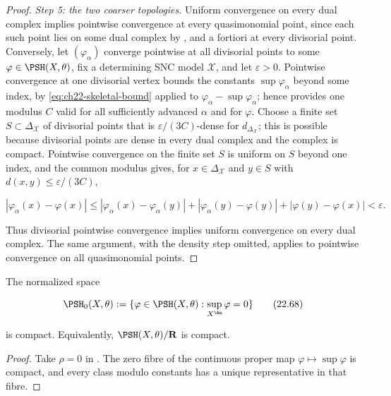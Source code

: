 \begin{proof}
\emph{Step 5: the two coarser topologies.}  Uniform convergence on every
dual complex implies pointwise convergence at every quasimonomial point,
since each such point lies on some dual complex by
, and a fortiori at every divisorial point.
Conversely, let \((\varphi_\alpha)\) converge pointwise at all divisorial
points to some \(\varphi\in\PSH(X,\theta)\), fix a determining SNC model
\(\mathcal X\), and let \(\varepsilon>0\).  Pointwise convergence at one
divisorial vertex bounds the constants \(\sup\varphi_\alpha\) beyond some
index, by \eqref{eq:ch22-skeletal-bound} applied to
\(\varphi_\alpha-\sup\varphi_\alpha\); hence
 provides one modulus \(C\) valid for all
sufficiently advanced \(\alpha\) and for \(\varphi\).  Choose a finite set
\(S\subset\Delta_{\mathcal X}\) of divisorial points that is
\(\varepsilon/(3C)\)-dense for \(d_{\Delta_{\mathcal X}}\); this is possible
because divisorial points are dense in every dual complex and the complex is
compact.  Pointwise convergence on the finite set \(S\) is uniform on
\(S\) beyond one index, and the common modulus gives, for
\(x\in\Delta_{\mathcal X}\) and \(y\in S\) with
\(d(x,y)\leq\varepsilon/(3C)\),

\[
 |\varphi_\alpha(x)-\varphi(x)|
 \leq|\varphi_\alpha(x)-\varphi_\alpha(y)|
   +|\varphi_\alpha(y)-\varphi(y)|
   +|\varphi(y)-\varphi(x)|
 <\varepsilon .
\]

Thus divisorial pointwise convergence implies uniform convergence on every
dual complex.  The same argument, with the density step omitted, applies to
pointwise convergence on all quasimonomial points.
\end{proof}

\begin{corollary}\label{thm:bfj-psh-compactness}
The normalized space

\[
 \PSH_0(X,\theta)
 :=\{\varphi\in\PSH(X,\theta):
                    \sup_{X^{\An}}\varphi=0\}
\tag{22.68}\label{eq:ch22-normalized-space}
\]

is compact.  Equivalently, \(\PSH(X,\theta)/\mathbf R\) is compact.
\end{corollary}

\begin{proof}
Take \(\rho=0\) in .  The zero fibre of
the continuous proper map \(\varphi\mapsto\sup\varphi\) is compact, and
every class modulo constants has a unique representative in that fibre.
\end{proof}

